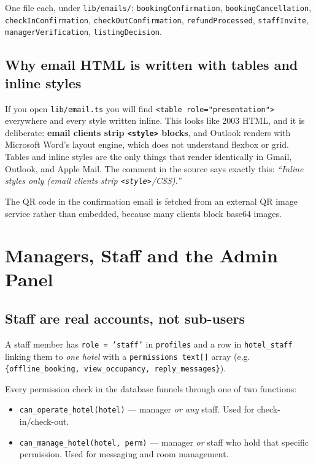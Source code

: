\documentclass[11pt,a4paper]{article}
\newcommand{\file}[1]{\texttt{\small #1}}
\begin{document}
One file each, under \file{lib/emails/}:
\texttt{bookingConfirmation}, \texttt{bookingCancellation},
\texttt{checkInConfirmation}, \texttt{checkOutConfirmation},
\texttt{refundProcessed}, \texttt{staffInvite}, \texttt{managerVerification},
\texttt{listingDecision}.

\subsection{Why email HTML is written with tables and inline styles}

If you open \file{lib/email.ts} you will find \texttt{<table role="presentation">}
everywhere and every style written inline. This looks like 2003 HTML, and it is
deliberate: \textbf{email clients strip \texttt{<style>} blocks}, and Outlook renders
with Microsoft Word's layout engine, which does not understand flexbox or grid.
Tables and inline styles are the only things that render identically in Gmail,
Outlook, and Apple Mail. The comment in the source says exactly this:
\emph{``Inline styles only (email clients strip \texttt{<style>}/CSS).''}

The QR code in the confirmation email is fetched from an external QR image service
rather than embedded, because many clients block base64 images.

\newpage
\section{Managers, Staff and the Admin Panel}

\subsection{Staff are real accounts, not sub-users}

A staff member has \texttt{role = 'staff'} in \texttt{profiles} and a row in
\texttt{hotel\_staff} linking them to \emph{one hotel} with a
\texttt{permissions text[]} array (e.g.
\texttt{\{offline\_booking, view\_occupancy, reply\_messages\}}).

Every permission check in the database funnels through one of two functions:

\begin{itemize}[leftmargin=*,noitemsep]
  \item \texttt{can\_operate\_hotel(hotel)} --- manager \emph{or any} staff.
        Used for check-in/check-out.
  \item \texttt{can\_manage\_hotel(hotel, perm)} --- manager \emph{or} staff who
        hold that specific permission. Used for messaging and room management.
\end{itemize}
\end{document}
